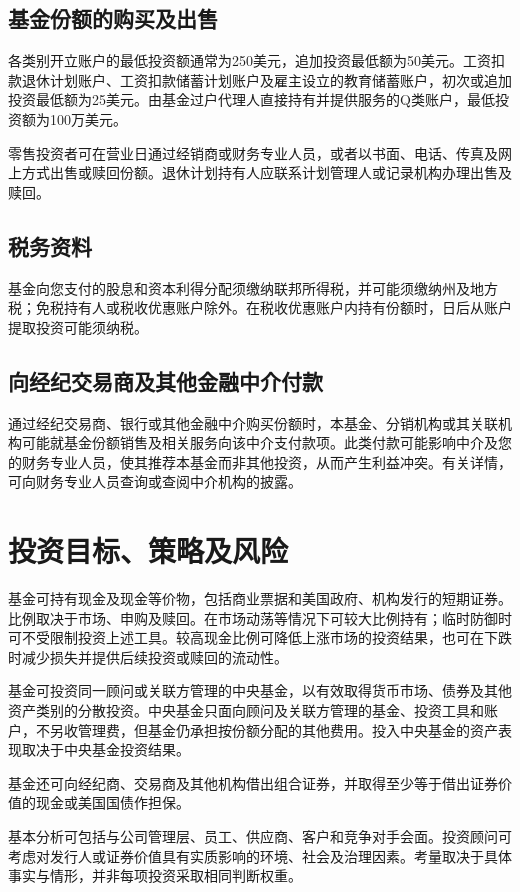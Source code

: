 \documentclass[UTF8,fontset=none,11pt,a4paper]{ctexart}
\begin{document}
\subsection*{基金份额的购买及出售}
各类别开立账户的最低投资额通常为250美元，追加投资最低额为50美元。工资扣款退休计划账户、工资扣款储蓄计划账户及雇主设立的教育储蓄账户，初次或追加投资最低额为25美元。由基金过户代理人直接持有并提供服务的Q类账户，最低投资额为100万美元。


零售投资者可在营业日通过经销商或财务专业人员，或者以书面、电话、传真及网上方式出售或赎回份额。退休计划持有人应联系计划管理人或记录机构办理出售及赎回。


\subsection*{税务资料}
基金向您支付的股息和资本利得分配须缴纳联邦所得税，并可能须缴纳州及地方税；免税持有人或税收优惠账户除外。在税收优惠账户内持有份额时，日后从账户提取投资可能须纳税。


\subsection*{向经纪交易商及其他金融中介付款}
通过经纪交易商、银行或其他金融中介购买份额时，本基金、分销机构或其关联机构可能就基金份额销售及相关服务向该中介支付款项。此类付款可能影响中介及您的财务专业人员，使其推荐本基金而非其他投资，从而产生利益冲突。有关详情，可向财务专业人员查询或查阅中介机构的披露。


\section*{投资目标、策略及风险}
基金可持有现金及现金等价物，包括商业票据和美国政府、机构发行的短期证券。比例取决于市场、申购及赎回。在市场动荡等情况下可较大比例持有；临时防御时可不受限制投资上述工具。较高现金比例可降低上涨市场的投资结果，也可在下跌时减少损失并提供后续投资或赎回的流动性。


基金可投资同一顾问或关联方管理的中央基金，以有效取得货币市场、债券及其他资产类别的分散投资。中央基金只面向顾问及关联方管理的基金、投资工具和账户，不另收管理费，但基金仍承担按份额分配的其他费用。投入中央基金的资产表现取决于中央基金投资结果。


基金还可向经纪商、交易商及其他机构借出组合证券，并取得至少等于借出证券价值的现金或美国国债作担保。


基本分析可包括与公司管理层、员工、供应商、客户和竞争对手会面。投资顾问可考虑对发行人或证券价值具有实质影响的环境、社会及治理因素。考量取决于具体事实与情形，并非每项投资采取相同判断权重。
\end{document}
